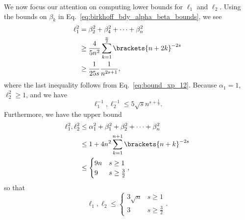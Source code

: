 We now focus our attention on computing lower bounds for $\ell_{1}$
and $\ell_{2}$. Using the bounds on $\beta_{k}$ in
Eq.~\eqref{eq:birkhoff_bdy_alpha_beta_bounds}, we see
%
\begin{align}
    \ell_{1}^{2} &= \beta_{2}^{2} + \beta_{4}^{2} + \cdots + \beta_{n}^{2}
        \nonumber\\
    &\ge \frac{4}{5n^{2}}\sum_{k=1}^{\frac{n}{2}}\brackets{n+2k}^{-2s}
        \nonumber\\
    &\ge \frac{1}{25s}\frac{1}{n^{2s+1}},
\end{align}
%
where the last inequality follows from Eq.~\eqref{eq:bound_xp_12}.
Because $\alpha_{1}=1$, $\ell_{2}^{2}\ge1$, and we have
%
\begin{equation}
    \ell_{1}^{-1},\ell_{2}^{-1} \le 5\sqrt{s}n^{s+\frac{1}{2}}.
\end{equation}
%
Furthermore, we have the upper bound
%
\begin{align}
    \ell_{1}^{2},\ell_{2}^{2}
        &\le \alpha_{1}^{2} + \beta_{1}^{2} + \beta_{2}^{2}
            + \cdots + \beta_{n}^{2} \nonumber\\
        &\le 1 + 4n^{2}\sum_{k=1}^{n+1}\brackets{n+k}^{-2s} \nonumber\\
        &\le \begin{cases} 9n &s\ge1 \\ 9 &s\ge\frac{3}{2} \end{cases},
\end{align}
%
so that
%
\begin{equation}
    \ell_{1},\ell_{2} \le \begin{cases}
            3\sqrt{n} &s\ge1 \\ 3 &s\ge\frac{3}{2} \end{cases}.
\end{equation}

